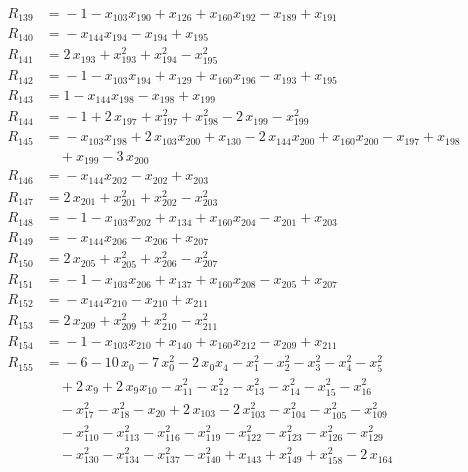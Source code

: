 \begin{align*}
R_{139} &={} -1 -x_{103} x_{190} +x_{126} +x_{160} x_{192} -x_{189} +x_{191} \\[2pt]
R_{140} &={} -x_{144} x_{194} -x_{194} +x_{195} \\[2pt]
R_{141} &={} 2\,x_{193} +x_{193}^{2} +x_{194}^{2} -x_{195}^{2} \\[2pt]
R_{142} &={} -1 -x_{103} x_{194} +x_{129} +x_{160} x_{196} -x_{193} +x_{195} \\[2pt]
R_{143} &={} 1 -x_{144} x_{198} -x_{198} +x_{199} \\[2pt]
R_{144} &={} -1 +2\,x_{197} +x_{197}^{2} +x_{198}^{2} -2\,x_{199} -x_{199}^{2} \\[2pt]
R_{145} &={} -x_{103} x_{198} +2\,x_{103} x_{200} +x_{130} -2\,x_{144} x_{200} +x_{160} x_{200} -x_{197} +x_{198} \\
&\quad{} +x_{199} -3\,x_{200} \\[2pt]
R_{146} &={} -x_{144} x_{202} -x_{202} +x_{203} \\[2pt]
R_{147} &={} 2\,x_{201} +x_{201}^{2} +x_{202}^{2} -x_{203}^{2} \\[2pt]
R_{148} &={} -1 -x_{103} x_{202} +x_{134} +x_{160} x_{204} -x_{201} +x_{203} \\[2pt]
R_{149} &={} -x_{144} x_{206} -x_{206} +x_{207} \\[2pt]
R_{150} &={} 2\,x_{205} +x_{205}^{2} +x_{206}^{2} -x_{207}^{2} \\[2pt]
R_{151} &={} -1 -x_{103} x_{206} +x_{137} +x_{160} x_{208} -x_{205} +x_{207} \\[2pt]
R_{152} &={} -x_{144} x_{210} -x_{210} +x_{211} \\[2pt]
R_{153} &={} 2\,x_{209} +x_{209}^{2} +x_{210}^{2} -x_{211}^{2} \\[2pt]
R_{154} &={} -1 -x_{103} x_{210} +x_{140} +x_{160} x_{212} -x_{209} +x_{211} \\[2pt]
R_{155} &={} -6 -10\,x_{0} -7\,x_{0}^{2} -2\,x_{0} x_{4} -x_{1}^{2} -x_{2}^{2} -x_{3}^{2} -x_{4}^{2} -x_{5}^{2} \\
&\quad{} +2\,x_{9} +2\,x_{9} x_{10} -x_{11}^{2} -x_{12}^{2} -x_{13}^{2} -x_{14}^{2} -x_{15}^{2} -x_{16}^{2} \\
&\quad{} -x_{17}^{2} -x_{18}^{2} -x_{20} +2\,x_{103} -2\,x_{103}^{2} -x_{104}^{2} -x_{105}^{2} -x_{109}^{2} \\
&\quad{} -x_{110}^{2} -x_{113}^{2} -x_{116}^{2} -x_{119}^{2} -x_{122}^{2} -x_{123}^{2} -x_{126}^{2} -x_{129}^{2} \\
&\quad{} -x_{130}^{2} -x_{134}^{2} -x_{137}^{2} -x_{140}^{2} +x_{143} +x_{149}^{2} +x_{158}^{2} -2\,x_{164} \\

\end{align*}
